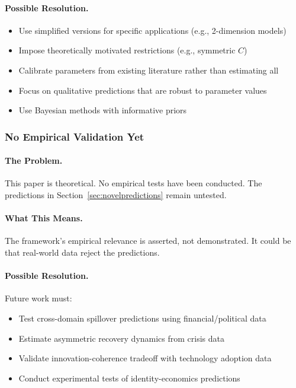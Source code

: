 \documentclass[12pt,a4paper]{article}
\begin{document}
\paragraph{Possible Resolution.}
\begin{itemize}
  \item Use simplified versions for specific applications (e.g., 2-dimension models)
  \item Impose theoretically motivated restrictions (e.g., symmetric $C$)
  \item Calibrate parameters from existing literature rather than estimating all
  \item Focus on qualitative predictions that are robust to parameter values
  \item Use Bayesian methods with informative priors
\end{itemize}

\subsubsection{No Empirical Validation Yet}

\paragraph{The Problem.}
This paper is theoretical. No empirical tests have been conducted.
The predictions in Section~\ref{sec:novelpredictions} remain untested.

\paragraph{What This Means.}
The framework's empirical relevance is asserted, not demonstrated.
It could be that real-world data reject the predictions.

\paragraph{Possible Resolution.}
Future work must:
\begin{itemize}
  \item Test cross-domain spillover predictions using financial/political data
  \item Estimate asymmetric recovery dynamics from crisis data
  \item Validate innovation-coherence tradeoff with technology adoption data
  \item Conduct experimental tests of identity-economics predictions
\end{itemize}
\end{document}

